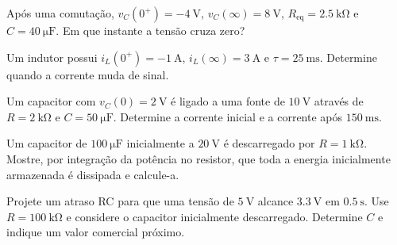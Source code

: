 \begin{questao}[3]{}
Após uma comutação, $v_C(0^+)=-\SI{4}{\volt}$, $v_C(\infty)=\SI{8}{\volt}$,
$R_{\mathrm{eq}}=\SI{2.5}{\kilo\ohm}$ e $C=\SI{40}{\micro\farad}$. Em que
instante a tensão cruza zero?
\end{questao}

\begin{questao}[3]{}
Um indutor possui $i_L(0^+)=-\SI{1}{\ampere}$, $i_L(\infty)=\SI{3}{\ampere}$ e
$\tau=\SI{25}{\milli\second}$. Determine quando a corrente muda de sinal.
\end{questao}

\begin{questao}[3]{}
Um capacitor com $v_C(0)=\SI{2}{\volt}$ é ligado a uma fonte de
$\SI{10}{\volt}$ através de $R=\SI{2}{\kilo\ohm}$ e
$C=\SI{50}{\micro\farad}$. Determine a corrente inicial e a corrente após
$\SI{150}{\milli\second}$.
\end{questao}

\begin{questao}[3]{}
Um capacitor de $\SI{100}{\micro\farad}$ inicialmente a $\SI{20}{\volt}$ é
descarregado por $R=\SI{1}{\kilo\ohm}$. Mostre, por integração da potência no
resistor, que toda a energia inicialmente armazenada é dissipada e calcule-a.
\end{questao}

\begin{questao}[3]{}
Projete um atraso RC para que uma tensão de $\SI{5}{\volt}$ alcance
$\SI{3.3}{\volt}$ em $\SI{0.5}{\second}$. Use $R=\SI{100}{\kilo\ohm}$ e
considere o capacitor inicialmente descarregado. Determine $C$ e indique um
valor comercial próximo.
\end{questao}

